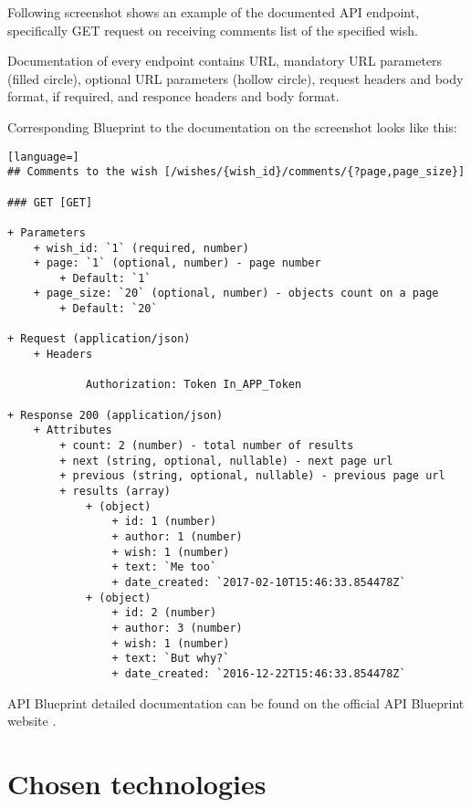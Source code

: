 Following screenshot shows an example of the documented \ac{API} endpoint, specifically GET request on receiving
comments list of the specified wish.

\pagebreak

Documentation of every endpoint contains URL, mandatory URL parameters (filled circle), optional URL parameters (hollow
circle), request headers and body format, if required, and responce headers and body format.

Corresponding Blueprint to the documentation on the screenshot looks like this:
\begin{lstlisting}[language=]
## Comments to the wish [/wishes/{wish_id}/comments/{?page,page_size}]

### GET [GET]

+ Parameters
    + wish_id: `1` (required, number)
    + page: `1` (optional, number) - page number
        + Default: `1`
    + page_size: `20` (optional, number) - objects count on a page
        + Default: `20`

+ Request (application/json)
    + Headers

            Authorization: Token In_APP_Token

+ Response 200 (application/json)
    + Attributes
        + count: 2 (number) - total number of results
        + next (string, optional, nullable) - next page url
        + previous (string, optional, nullable) - previous page url
        + results (array)
            + (object)
                + id: 1 (number)
                + author: 1 (number)
                + wish: 1 (number)
                + text: `Me too`
                + date_created: `2017-02-10T15:46:33.854478Z`
            + (object)
                + id: 2 (number)
                + author: 3 (number)
                + wish: 1 (number)
                + text: `But why?`
                + date_created: `2016-12-22T15:46:33.854478Z`
\end{lstlisting}

API Blueprint detailed documentation can be found on the official API Blueprint website \cite{apiblueprint}.



\section{Chosen technologies}

